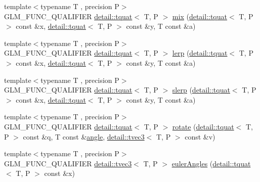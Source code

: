 \begin{DoxyCompactItemize}
\item 
{\footnotesize template$<$typename T , precision P$>$ }\\G\+L\+M\+\_\+\+F\+U\+N\+C\+\_\+\+Q\+U\+A\+L\+I\+F\+I\+ER \hyperlink{structglm_1_1detail_1_1tquat}{detail\+::tquat}$<$ T, P $>$ \hyperlink{group__gtc__quaternion_gafabf175ae3e2cd30bf58dc313321955a}{mix} (\hyperlink{structglm_1_1detail_1_1tquat}{detail\+::tquat}$<$ T, P $>$ const \&x, \hyperlink{structglm_1_1detail_1_1tquat}{detail\+::tquat}$<$ T, P $>$ const \&y, T const \&a)
\item 
{\footnotesize template$<$typename T , precision P$>$ }\\G\+L\+M\+\_\+\+F\+U\+N\+C\+\_\+\+Q\+U\+A\+L\+I\+F\+I\+ER \hyperlink{structglm_1_1detail_1_1tquat}{detail\+::tquat}$<$ T, P $>$ \hyperlink{group__gtc__quaternion_gafc1c989eaa2c786d34218b176f680fe0}{lerp} (\hyperlink{structglm_1_1detail_1_1tquat}{detail\+::tquat}$<$ T, P $>$ const \&x, \hyperlink{structglm_1_1detail_1_1tquat}{detail\+::tquat}$<$ T, P $>$ const \&y, T const \&a)
\item 
{\footnotesize template$<$typename T , precision P$>$ }\\G\+L\+M\+\_\+\+F\+U\+N\+C\+\_\+\+Q\+U\+A\+L\+I\+F\+I\+ER \hyperlink{structglm_1_1detail_1_1tquat}{detail\+::tquat}$<$ T, P $>$ \hyperlink{group__gtc__quaternion_ga7468a211a20ea56ea5cfb0625226868a}{slerp} (\hyperlink{structglm_1_1detail_1_1tquat}{detail\+::tquat}$<$ T, P $>$ const \&x, \hyperlink{structglm_1_1detail_1_1tquat}{detail\+::tquat}$<$ T, P $>$ const \&y, T const \&a)
\item 
{\footnotesize template$<$typename T , precision P$>$ }\\G\+L\+M\+\_\+\+F\+U\+N\+C\+\_\+\+Q\+U\+A\+L\+I\+F\+I\+ER \hyperlink{structglm_1_1detail_1_1tquat}{detail\+::tquat}$<$ T, P $>$ \hyperlink{group__gtc__quaternion_gaa9a8891f03d8f5373525c4b3159c1c73}{rotate} (\hyperlink{structglm_1_1detail_1_1tquat}{detail\+::tquat}$<$ T, P $>$ const \&q, T const \&\hyperlink{group__gtc__quaternion_ga23a3fc7ada5bbb665ff84c92c6e0542c}{angle}, \hyperlink{structglm_1_1detail_1_1tvec3}{detail\+::tvec3}$<$ T, P $>$ const \&v)
\item 
{\footnotesize template$<$typename T , precision P$>$ }\\G\+L\+M\+\_\+\+F\+U\+N\+C\+\_\+\+Q\+U\+A\+L\+I\+F\+I\+ER \hyperlink{structglm_1_1detail_1_1tvec3}{detail\+::tvec3}$<$ T, P $>$ \hyperlink{group__gtc__quaternion_gade4034f49ccadf63cb31a7fb5fa3c8aa}{euler\+Angles} (\hyperlink{structglm_1_1detail_1_1tquat}{detail\+::tquat}$<$ T, P $>$ const \&x)

\end{DoxyCompactItemize}
